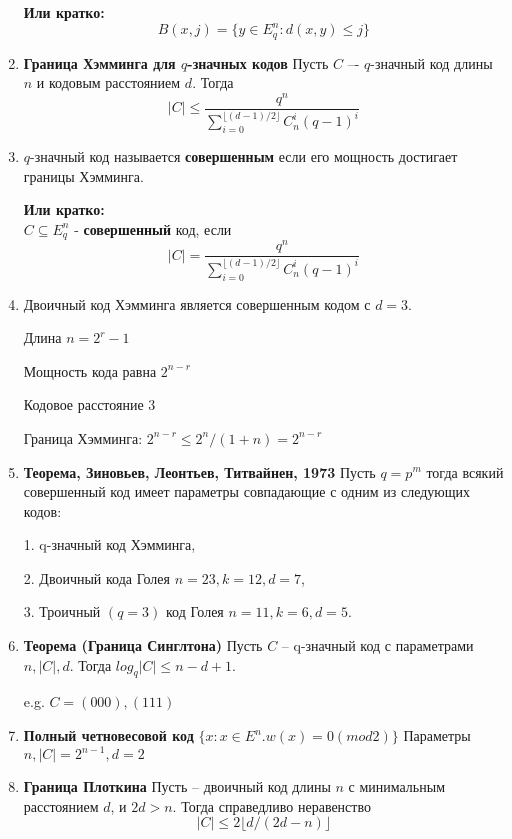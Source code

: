 \documentclass[a4paper, 12pt]{report}
\begin{document}
\begin{enumerate}
\textbf{Или кратко:}\\
\[B(x,j) = \lbrace y\in E_{q}^{n} : d(x,y) \leq j\rbrace\]

\item \textbf{Граница Хэмминга для $q$-значных кодов}
Пусть $C$ –- $q$-значный код длины $n$ и кодовым расстоянием $d$.
Тогда
\[  |C| \leq \frac {q^n} {{\sum_{i = 0}^{\lfloor(d - 1)/2\rfloor} C_n^i (q - 1)^i}} \]

\item
$q$-значный код называется \textbf{совершенным} если его мощность
достигает границы Хэмминга.

\textbf{Или кратко:}\\
$C \subseteq E_{q}^{n}$ - \textbf{совершенный} код, если 
\[|C| = \frac {q^n} {{\sum_{i = 0}^{\lfloor(d - 1)/2\rfloor} C_n^i (q - 1)^i}} \] 

\item 
Двоичный код Хэмминга является совершенным кодом с $d = 3$.

Длина $n = 2^r - 1$

Мощность кода равна $2^{n-r}$

Кодовое расстояние $3$

Граница Хэмминга: $2^{n-r} \leq 2^n/(1 + n) = 2^{n-r}$

\newpage

\item \textbf{Теорема, Зиновьев, Леонтьев, Титвайнен, 1973}
Пусть $q = p^m$ тогда всякий совершенный код имеет параметры
совпадающие с одним из следующих кодов:

1. q-значный код Хэмминга,

2. Двоичный кода Голея $n = 23, k = 12, d = 7$,

3. Троичный $(q = 3)$ код Голея $n = 11, k = 6, d = 5$.

\item \textbf{Теорема (Граница Синглтона)}
Пусть $C$ – q-значный код с параметрами $n, |C|, d$. Тогда
$log_{q}|C| \leq n - d + 1$.

e.g. $C = {(000),(111)}$


\item \textbf{Полный четновесовой код}
$\{x : x \in E^n. w(x) = 0(mod 2)\}$
Параметры $n, |C| = 2^{n - 1}, d = 2$

\item \textbf{Граница Плоткина}
Пусть – двоичный код длины $n$ с минимальным расстоянием
$d$, и $2d > n$. Тогда справедливо неравенство
\[ |C| \leq 2 \lfloor   d/(2d - n) \rfloor \]

\end{enumerate}
\end{document}
